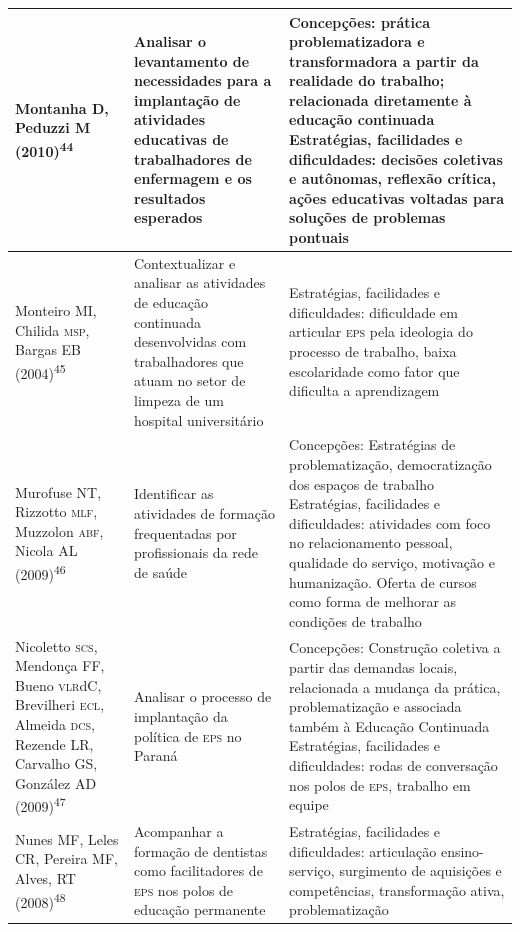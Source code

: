 \documentclass{article}
\begin{document}
\begin{table}
\begin{xtabular}{ l | l | l }
Montanha D, Peduzzi M (2010)\textsuperscript{44}

& Analisar o levantamento de necessidades para a implantação de atividades
educativas de trabalhadores de enfermagem e os resultados esperados
& Concepções: prática problematizadora e transformadora a partir da realidade do
trabalho; relacionada diretamente à educação continuada Estratégias, facilidades
e dificuldades: decisões coletivas e autônomas, reflexão crítica, ações
educativas voltadas para soluções de problemas pontuais
\\ \hline

Monteiro MI, Chilida \textsc{msp}, Bargas EB (2004)\textsuperscript{45}

& Contextualizar e analisar as atividades de educação continuada desenvolvidas
com trabalhadores que atuam no setor de limpeza de um hospital universitário
& Estratégias, facilidades e dificuldades: dificuldade em articular \textsc{eps} pela
ideologia do processo de trabalho, baixa escolaridade como fator que dificulta a
aprendizagem
\\ \hline

Murofuse NT, Rizzotto \textsc{mlf}, Muzzolon \textsc{abf}, Nicola AL (2009)\textsuperscript{46}

& Identificar as atividades de formação frequentadas por profissionais da rede
de saúde
& Concepções: Estratégias de problematização, democratização dos espaços de
trabalho Estratégias, facilidades e dificuldades: atividades com foco no
relacionamento pessoal, qualidade do serviço, motivação e humanização. Oferta de
cursos como forma de melhorar as condições de trabalho
\\ \hline

Nicoletto \textsc{scs}, Mendonça FF, Bueno \textsc{vlr}dC, Brevilheri \textsc{ecl}, Almeida \textsc{dcs}, Rezende
LR, Carvalho GS, González AD (2009)\textsuperscript{47}

& Analisar o processo de implantação da política de \textsc{eps} no Paraná
& Concepções: Construção coletiva a partir das demandas locais, relacionada a
mudança da prática, problematização e associada também à Educação Continuada
Estratégias, facilidades e dificuldades: rodas de conversação nos polos de \textsc{eps},
trabalho em equipe
\\ \hline

Nunes MF, Leles CR, Pereira MF, Alves, RT (2008)\textsuperscript{48}

& Acompanhar a formação de dentistas como facilitadores de \textsc{eps} nos polos de
educação permanente
& Estratégias, facilidades e dificuldades: articulação ensino-serviço,
surgimento de aquisições e competências, transformação ativa, problematização
\\ \hline


\end{xtabular}
\end{table}
\end{document}
